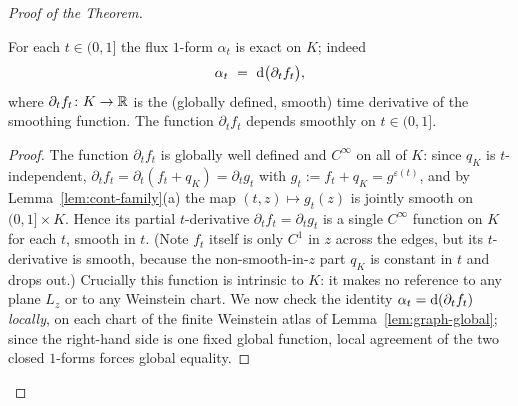 \begin{proof}[Proof of the Theorem]
\begin{qeightlemma}\label{lem:flux-exact}
For each $t\in(0,1]$ the flux $1$-form $\alpha_t$ is exact on $K$; indeed
\[
\alpha_t\ =\ \qeightdd\bigl(\partial_t f_t\bigr),
\]
where $\partial_t f_t\colon K\to\mathbb{R}$ is the (globally defined, smooth) time
derivative of the smoothing function. The function $\partial_t f_t$ depends smoothly
on $t\in(0,1]$.
\end{qeightlemma}

\begin{proof}
The function $\partial_t f_t$ is globally well defined and $C^\infty$ on all of
$K$: since $q_K$ is $t$-independent, $\partial_t f_t=\partial_t(f_t+q_K)=\partial_t g_t$
with $g_t:=f_t+q_K=g^{\varepsilon(t)}$, and by Lemma~\ref{lem:cont-family}(a) the
map $(t,z)\mapsto g_t(z)$ is jointly smooth on $(0,1]\times K$. Hence its partial
$t$-derivative $\partial_t f_t=\partial_t g_t$ is a single $C^\infty$ function on
$K$ for each $t$, smooth in $t$. (Note $f_t$ itself is only $C^1$ in $z$ across the
edges, but its $t$-derivative is smooth, because the non-smooth-in-$z$ part $q_K$
is constant in $t$ and drops out.)
Crucially this function is intrinsic to $K$: it makes no reference to any plane
$L_z$ or to any Weinstein chart. We now check the identity $\alpha_t=\mathrm d(\partial_t f_t)$
\emph{locally}, on each chart of the finite Weinstein atlas of
Lemma~\ref{lem:graph-global}; since the right-hand side is one fixed global function,
local agreement of the two closed $1$-forms forces global equality.


\end{proof}
\end{proof}
